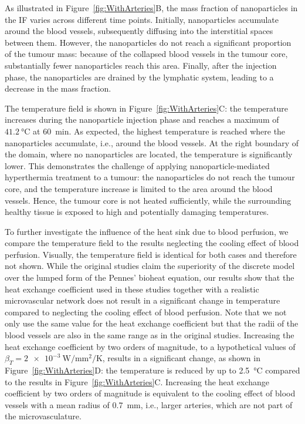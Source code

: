 \documentclass[Times1COL,AMA]{WileyNJDv5} %
\begin{document}
As illustrated in Figure~\ref{fig:WithArteries}B, the mass fraction of nanoparticles in the IF varies across different time points.
Initially, nanoparticles accumulate around the blood vessels, subsequently diffusing into the interstitial spaces between them.
However, the nanoparticles do not reach a significant proportion of the tumour mass:
because of the collapsed blood vessels in the tumour core, substantially fewer nanoparticles reach this area.
Finally, after the injection phase, the nanoparticles are drained by the lymphatic system, leading to a decrease in the mass fraction.

The temperature field is shown in Figure~\ref{fig:WithArteries}C:
the temperature increases during the nanoparticle injection phase and reaches a maximum of $\SI{41.2}{\celsius}$ at \SI{60}{\minute}.
As expected, the highest temperature is reached where the nanoparticles accumulate, i.e., around the blood vessels.
At the right boundary of the domain, where no nanoparticles are located, the temperature is significantly lower.
This demonstrates the challenge of applying nanoparticle-mediated hyperthermia treatment to a tumour:
the nanoparticles do not reach the tumour core, and the temperature increase is limited to the area around the blood vessels.
Hence, the tumour core is not heated sufficiently, while the surrounding healthy tissue is exposed to high and potentially damaging temperatures.

To further investigate the influence of the heat sink due to blood perfusion, we compare the temperature field to the results neglecting the cooling effect of blood perfusion.
Visually, the temperature field is identical for both cases and therefore not shown.
While the original studies \cite{Nabil2015,Nabil2016} claim the superiority of the discrete model over the lumped form of the Pennes' bioheat equation, our results show that the heat exchange coefficient used in these studies together with a realistic microvascular network does not result in a significant change in temperature compared to neglecting the cooling effect of blood perfusion.
Note that we not only use the same value for the heat exchange coefficient but that the radii of the blood vessels are also in the same range as in the original studies.
Increasing the heat exchange coefficient by two orders of magnitude, to a hypothetical values of $\beta_T = \SI{2e-3}{\watt\per\milli\meter\squared\per\kelvin}$, results in a significant change, as shown in Figure~\ref{fig:WithArteries}D:
the temperature is reduced by up to \SI{2.5}{\celsius} compared to the results in Figure~\ref{fig:WithArteries}C.
Increasing the heat exchange coefficient by two orders of magnitude is equivalent to the cooling effect of blood vessels with a mean radius of \SI{0.7}{\milli\meter}, i.e., larger arteries, which are not part of the microvasculature. \cite{Muller2008}
\end{document}
